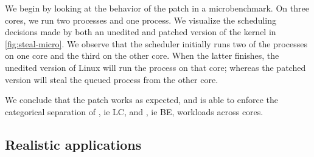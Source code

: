 We begin by looking at the behavior of the patch in a microbenchmark. On three
cores, we run two \schednormal{} processes and one \schedidle{} process. We
visualize the scheduling decisions made by both an unedited and patched version
of the kernel in \autoref{fig:steal-micro}. We observe that the scheduler
initially runs two of the \schednormal{} processes on one core and the third on
the other core. When the latter finishes, the unedited version of Linux will run
the \schedidle{} process on that core; whereas the patched version will steal
the queued \schednormal{} process from the other core. 

We conclude that the patch works as expected, and is able to enforce the
categorical separation of \schednormal{}, ie LC, and \schedidle{}, ie BE,
workloads across cores.

\subsection{Realistic applications}


